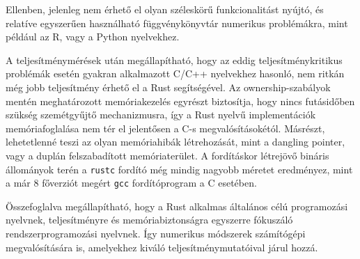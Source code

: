 Ellenben, jelenleg nem érhető el olyan széleskörű funkcionalitást nyújtó, és relatíve egyszerűen használható függvénykönyvtár numerikus problémákra, mint például az R, vagy a Python nyelvekhez.

A teljesítménymérések után megállapítható, hogy az eddig teljesítménykritikus problémák esetén gyakran alkalmazott C/C++ nyelvekhez hasonló, nem ritkán még jobb teljesítmény érhető el a Rust segítségével. Az ownership-szabályok mentén meghatározott memóriakezelés egyrészt biztosítja, hogy nincs futásidőben szükség szemétgyűjtő mechanizmusra, így a Rust nyelvű implementációk memóriafoglalása nem tér el jelentősen a C-s megvalósításokétól. Másrészt, lehetetlenné teszi az olyan memóriahibák létrehozását, mint a dangling pointer, vagy a duplán felszabadított memóriaterület. A fordításkor létrejövő bináris állományok terén a \lstinline{rustc} fordító még mindig nagyobb méretet eredményez, mint a már 8 főverziót megért \lstinline{gcc} fordítóprogram a C esetében.

Összefoglalva megállapítható, hogy a Rust alkalmas általános célú programozási nyelvnek, teljesítményre és memóriabiztonságra egyszerre fókuszáló rendszerprogramozási nyelvnek. Így numerikus módszerek számítógépi megvalósítására is, amelyekhez kiváló teljesítménymutatóival járul hozzá.
